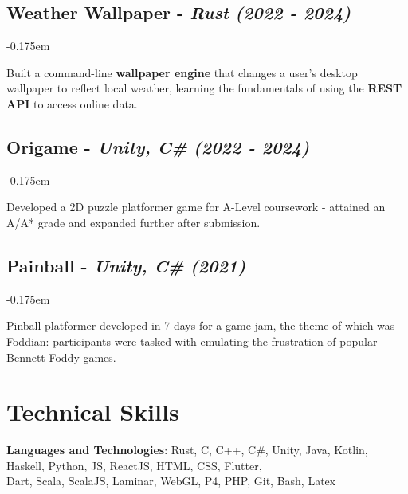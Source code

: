 \documentclass{article}
\newcommand{\dates}[1]{\hfill\textit{(#1)}}
\newcommand{\indentsubsection}[2]{
    \subsection*{#1}
    #2
}
\newcommand{\project}[4]{
    \indentsubsection{\textbf{#1} - \textit{#3} \dates{#2}}
    \vspace{-0.175em}
    \begin{minipage}{\dimexpr\textwidth - 2em}
        #4
    \end{minipage}    
    \hfill
    \vspace{-0.15em}
}
\begin{document}
\project{Weather Wallpaper}{2022 - 2024}{Rust}{
    Built a command-line \textbf{wallpaper engine} that changes a user's desktop wallpaper to reflect local weather, learning the fundamentals 
    of using the \textbf{REST API} to access online data.
}

\project{Origame}{2022 - 2024}{Unity, C\#}{
    Developed a 2D puzzle platformer game for A-Level coursework - attained an A/A* grade and expanded further after submission. 
}

\project{Painball}{2021}{Unity, C\#}{
    Pinball-platformer developed in 7 days for a game jam, the theme of which was Foddian: 
    participants were tasked with emulating the frustration of popular Bennett Foddy games.
}
    

\section*{Technical Skills}

\textbf{Languages and Technologies}: 
    Rust, C, C++, C\#, Unity, Java, Kotlin, Haskell, Python, JS, ReactJS, HTML, CSS, Flutter, \\
    \indent Dart, Scala, ScalaJS, Laminar, WebGL, P4, PHP, Git, Bash, Latex
\end{document}

